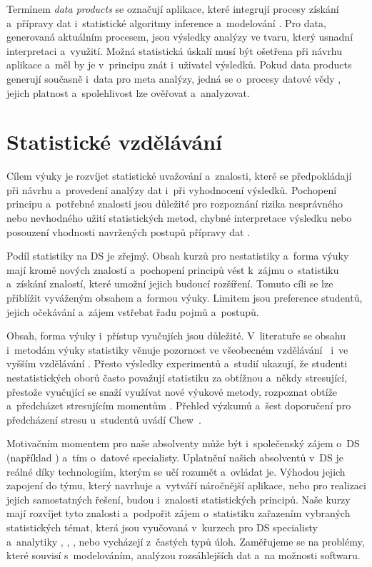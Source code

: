 Termínem {\it data products} se označují aplikace, které integrují procesy získání a~přípravy dat i~statistické algoritmy inference a~modelování \cite{ben}. Pro data, generovaná aktuálním procesem, jsou výsledky analýzy ve tvaru, který usnadní interpretaci a~využití. Možná statistická úskalí musí být ošetřena při návrhu aplikace a~měl by je v~principu znát i~uživatel výsledků. Pokud data products generují současně i~data  pro meta analýzy, jedná se o~procesy datové vědy  \cite{don}, jejich platnost a~spolehlivost lze ověřovat a~analyzovat.
 


\section{Statistické vzdělávání}
Cílem výuky je rozvíjet statistické uvažování a~znalosti, které se předpokládají při návrhu a~provedení analýzy dat i~při vyhodnocení výsledků. Pochopení principu a~potřebné znalosti jsou důležité pro rozpoznání rizika nesprávného nebo nevhodného užití statistických metod, chybné interpretace výsledku nebo posouzení vhodnosti navržených postupů přípravy dat \cite{ioa}. 

Podíl statistiky na DS je zřejmý. Obsah kurzů pro nestatistiky a~forma výuky mají kromě nových znalostí a~pochopení principů vést k~zájmu o~statistiku a~získání znalostí, které umožní jejich budoucí rozšíření. Tomuto cíli se lze přiblížit vyváženým obsahem a~formou výuky. Limitem jsou preference studentů, jejich očekávání a~zájem vstřebat řadu pojmů a~postupů. 

Obsah, forma výuky i~přístup vyučujích jsou důležité. V~literatuře se obsahu i~metodám výuky statistiky věnuje pozornost ve všeobecném vzdělávání~\cite{car} i~ve vyšším vzdělávání \cite{zie}. Přesto výsledky experimentů a~studií ukazují, že studenti nestatistických oborů často považují statistiku za obtížnou a~někdy stresující, přestože vyučující se snaží využívat nové výukové metody, rozpoznat obtíže a~předcházet stresujícím momentům \cite{gar}. Přehled výzkumů a~šest doporučení pro předcházení stresu u~studentů uvádí Chew~\cite{chew}. 

Motivačním momentem pro naše absolventy může být i~společenský zájem o~DS (například \cite{dds}) a~tím o~datové specialisty. Uplatnění našich absolventů v~DS je reálné díky technologiím, kterým se učí rozumět a~ovládat je. Výhodou jejich zapojení do týmu, který navrhuje a~vytváří náročnější aplikace, nebo pro realizaci jejich samostatných řešení, budou i~znalosti statistických principů. Naše kurzy mají rozvíjet tyto znalosti a~podpořit zájem o~statistiku zařazením vybraných statistických témat, která jsou vyučovaná v~kurzech pro DS specialisty a~analytiky \cite{dev}, \cite{eri}, \cite{mik}, nebo vycházejí z~častých typů úloh. Zaměřujeme se na problémy, které souvisí s~modelováním, analýzou rozsáhlejších dat  a~na možnosti softwaru. 

